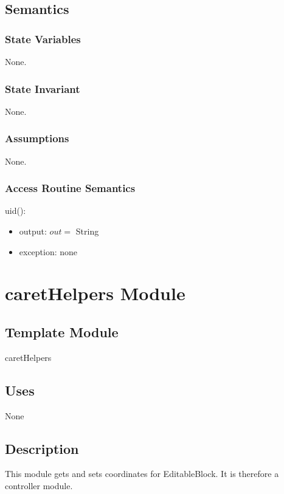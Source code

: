 \documentclass[12pt, titlepage]{article}
\begin{document}
\subsection{Semantics}

\subsubsection{State Variables}

None.

\subsubsection{State Invariant}

None.

\subsubsection{Assumptions}

None.

\subsubsection{Access Routine Semantics}

\noindent uid():
\begin{itemize}
\item output: $out =$ String
\item exception: none
\end{itemize}

\section{caretHelpers Module}

\subsection{Template Module}

caretHelpers

\subsection{Uses}

None

\subsection{Description}
This module gets and sets coordinates for EditableBlock. It is therefore a controller module.
\end{document}
